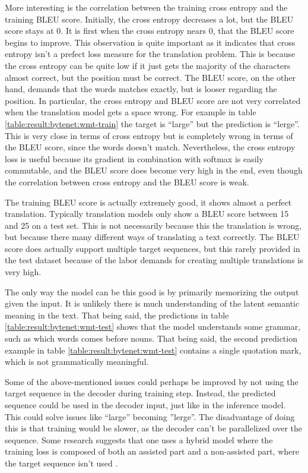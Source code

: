 More interesting is the correlation between the training cross entropy and the training BLEU score. Initially, the cross entropy decreases a lot, but the BLEU score stays at 0. It is first when the cross entropy nears 0, that the BLEU score begins to improve. This observation is quite important as it indicates that cross entropy isn't a prefect loss measure for the translation problem. This is because the cross entropy can be quite low if it just gets the majority of the characters almost correct, but the position must be correct. The BLEU score, on the other hand, demands that the words matches exactly, but is looser regarding the position. In particular, the cross entropy and BLEU score are not very correlated when the translation model gets a space wrong. For example in table \ref{table:result:bytenet:wmt-train} the target is ``large'' but the prediction is ``lerge''. This is very close in terms of cross entropy but is completely wrong in terms of the BLEU score, since the words doesn't match. Nevertheless, the cross entropy loss is useful because its gradient in combination with softmax is easily commutable, and the BLEU score does become very high in the end, even though the correlation between cross entropy and the BLEU score is weak.

The training BLEU score is actually extremely good, it shows almost a perfect translation. Typically translation models only show a BLEU score between 15 and 25 on a test set. This is not necessarily because this the translation is wrong, but because there many different ways of translating a text correctly. The BLEU score does actually support multiple target sequences, but this rarely provided in the test dataset because of the labor demands for creating multiple translations is very high.

The only way the model can be this good is by primarily memorizing the output given the input. It is unlikely there is much understanding of the latent semantic meaning in the text. That being said, the predictions in table \ref{table:result:bytenet:wmt-test} shows that the model understands some grammar, such as which words comes before nouns. That being said, the second prediction example in table \ref{table:result:bytenet:wmt-test} contains a single quotation mark, which is not grammatically meaningful. 

Some of the above-mentioned issues could perhaps be improved by not using the target sequence in the decoder during training step. Instead, the predicted sequence could be used in the decoder input, just like in the inference model. This could solve issues like ``large'' becoming ''lerge''. The disadvantage of doing this is that training would be slower, as the decoder can't be parallelized over the sequence. Some research suggests that one uses a hybrid model where the training loss is composed of both an assisted part and a non-assisted part, where the target sequence isn't used \cite{no-assist-train}.

